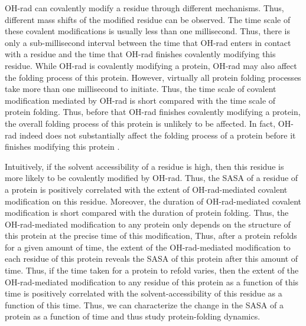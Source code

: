 \Gls{OH-rad} can covalently modify a residue through different mechanisms.
Thus, different mass shifts of the modified residue can be observed.
The time scale of these covalent modifications is usually less than one millisecond.
Thus, there is only a sub-millisecond interval between the time that \gls{OH-rad} enters in contact with a residue 
		and the time that \gls{OH-rad} finishes covalently modifying this residue. 
While \gls{OH-rad} is covalently modifying a protein, \gls{OH-rad} may also affect the folding process of this protein.
However, virtually all protein folding processes take more than one millisecond to initiate.
Thus, the time scale of covalent modification mediated by \gls{OH-rad} is short compared with the time scale of protein folding.
Thus, before that \gls{OH-rad} finishes covalently modifying a protein, the overall folding process of this protein is unlikely to be affected.
In fact, \gls{OH-rad} indeed does not substantially affect the folding process of a protein before it finishes modifying this protein \cite{gau2011advancement}.

Intuitively, if the solvent accessibility of a residue is high, then this residue is more likely to be covalently modified by \gls{OH-rad}.
Thus, the \gls{SASA} %
	of a residue of a protein is positively correlated with the extent of \gls{OH-rad}-mediated covalent modification on this residue.
Moreover, the duration of \gls{OH-rad}-mediated covalent modification is short compared with the duration of protein folding. 
Thus, the \gls{OH-rad}-mediated modification to any protein only depends on the structure of this protein at the precise time of this modification,
Thus, after a protein refolds for a given amount of time,
		the extent of the \gls{OH-rad}-mediated modification to each residue of this protein reveals the \gls{SASA} of this protein after this amount of time.
Thus, if the time taken for a protein to refold varies,
	then the extent of the \gls{OH-rad}-mediated modification to any residue of this protein as a function of this time 
	is positively correlated with the solvent-accessibility of this residue as a function of this time.{}
Thus, we can characterize the change in the \gls{SASA} of a protein as a function of time and thus study protein-folding dynamics.

